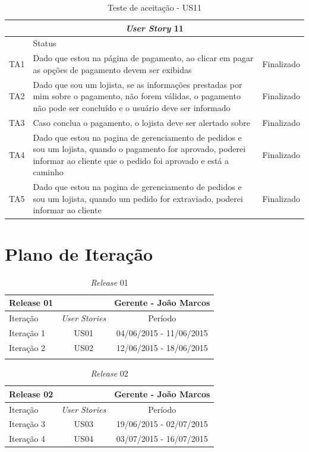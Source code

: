 \documentclass[a4paper,12pt]{monografia}
\begin{document}
\begin{longtable}{|l|p{11.8cm}|c|}
\caption{Teste de aceitação - US11}
\label{quadro:teste-aceitacao-us11}
\hline
\multicolumn{3}{|c|}{\textbf{\textit{User Story} 11}}\\
\hline		
\rowcolor{ballblue}
\multicolumn{2}{|c|}{Testes de aceitação} & Status\\	
\hline
TA1 & Dado que estou na página de pagamento, ao clicar em pagar as opções de pagamento devem ser exibidas & Finalizado\\
\hline
TA2 & Dado que sou um lojista, se as informações prestadas por mim sobre o pagamento, não forem válidas, o pagamento não pode ser concluído e o usuário deve ser informado  & Finalizado\\
\hline
TA3 & Caso conclua o pagamento, o lojista deve ser alertado sobre  & Finalizado\\
\hline
TA4 & Dado que estou na pagina de gerenciamento de pedidos e sou um lojista, quando o pagamento for aprovado, poderei informar ao cliente que o pedido foi aprovado e está a caminho  & Finalizado\\
\hline
TA5 & Dado que estou na pagina de gerenciamento de pedidos e sou um lojista, quando um pedido for extraviado, poderei informar ao cliente  & Finalizado\\
\hline
\end{longtable}

\chapter{Plano de Iteração} %
\label{apdc:plano_de_itercao}

\begin{table}[H]
\centering
\caption{\textit{Release} 01}
\label{qua:release01}
\begin{tabular}{|lc|c|}
\rowcolor{ballblue}
\hline
\textbf{Release 01} & & Gerente - João Marcos \\
\hline
Iteração & \textit{\textit{User Stories}} & Período\\
\hline
Iteração 1    & US01           & 04/06/2015 - 11/06/2015\\
Iteração 2    & US02           & 12/06/2015 - 18/06/2015\\
\hline
\rowcolor{ballblue}
\hline				
\end{tabular}
\end{table}

\begin{table}[H]
\centering
\caption{\textit{Release} 02}
\label{qua:release02}
\begin{tabular}{|lc|c|}
\rowcolor{ballblue}
\hline
\textbf{Release 02} & & Gerente - João Marcos \\
\hline
Iteração & \textit{\textit{User Stories}} & Período\\
\hline
Iteração 3    & US03 		   & 19/06/2015 - 02/07/2015\\
Iteração 4    & US04 		   & 03/07/2015 - 16/07/2015\\
\hline
\end{tabular}
\end{table}
\end{document}
